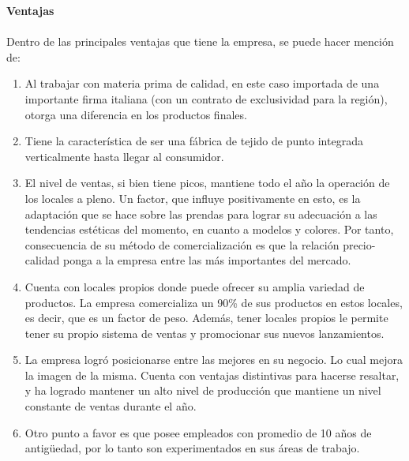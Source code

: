 \documentclass[a4paper,10pt,titlepage]{article}
\begin{document}
		\textbf {Ventajas}\\\\
		\indent Dentro de las principales ventajas que tiene la empresa, se puede hacer menci\'on de:
		\begin{enumerate}
		 \item Al trabajar con materia prima de calidad, en este caso importada de una importante firma italiana (con un contrato de exclusividad para la regi\'{o}n), otorga una diferencia en los productos finales.
		 \item Tiene la caracter\'{i}stica de ser una f\'{a}brica de tejido de punto integrada verticalmente hasta llegar al consumidor.
		 \item El nivel de ventas, si bien tiene picos, mantiene todo el a\~no la operaci\'{o}n de los locales a pleno. Un factor, que influye positivamente en esto, es la adaptaci\'{o}n que se hace sobre las prendas para lograr su adecuaci\'{o}n a las tendencias est\'{e}ticas del momento, en cuanto a modelos y colores. Por tanto, consecuencia de su m\'{e}todo de comercializaci\'{o}n es que la relaci\'{o}n precio-calidad ponga a la empresa entre las m\'{a}s importantes del mercado.
		 \item Cuenta con locales propios donde puede ofrecer su amplia variedad de productos. La empresa comercializa un 90\% de sus productos en estos locales, es decir, que es un factor de peso. Además, tener locales propios le permite tener su propio sistema de ventas y promocionar sus nuevos lanzamientos.
		 \item La empresa logr\'o posicionarse entre las mejores en su negocio. Lo cual mejora la imagen de la misma. Cuenta con ventajas distintivas para hacerse resaltar, y ha logrado mantener un alto nivel de producci\'on que mantiene un nivel constante de ventas durante el a\~no.
		 \item Otro punto a favor es que posee empleados con promedio de 10 a\~nos de antig\"uedad, por lo tanto son experimentados en sus \'areas de trabajo.\\
		\end{enumerate}
		
\end{document}
